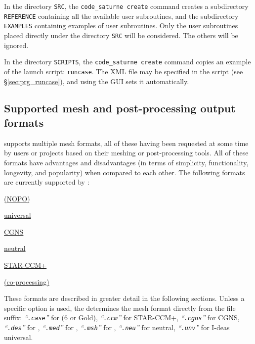 {{{{In the directory \texttt{SRC}, the \texttt{code\_saturne~create} command creates a
subdirectory \texttt{REFERENCE} containing all the available user subroutines,
and the subdirectory \texttt{EXAMPLES} containing examples of user subroutines.
Only the user subroutines placed directly under
the directory \texttt{SRC} will be considered. The others will be ignored.

In the directory \texttt{SCRIPTS}, the \texttt{code\_saturne~create} command copies an example of the launch script: \texttt{runcase}.
The XML file may be specified in the script (see \S\ref{sec:prg_runcase}),
and using the GUI sets it automatically.

\smallskip \noindent

\subsection{Supported mesh and post-processing output formats
\label{sec:formats}}

\CS supports multiple mesh formats, all of these having been requested
at some time by users or projects based on their meshing or post-processing
tools. All of these formats have advantages and disadvantages (in terms
of simplicity, functionality, longevity, and popularity) when compared to
each other. The following formats are currently supported by \CS:

\begin{list}{-}{}

\item \hyperref[sec:fmtdesc_des]{\simail (NOPO)}
\item \hyperref[sec:fmtdesc_unv]{\ideas universal}
\item \hyperref[sec:fmtdesc_med]{\med}
\item \hyperref[sec:fmtdesc_cgns]{CGNS}
\item \hyperref[sec:fmtdesc_ensight6]{}
\item \hyperref[sec:fmtdesc_ensightg]{\ensightg}
\item \hyperref[sec:fmtdesc_neu]{\gambit neutral}
\item \hyperref[sec:fmtdesc_gmsh]{\gmsh}
\item \hyperref[sec:fmtdesc:ccm]{STAR-CCM+}
\item \hyperref[sec:fmtdesc_catalyst]{\catalyst (co-processing)}
\end{list}

These formats are described in greater detail in the following sections.
Unless a specific option is used, the \pcs determines the mesh format directly
from the file suffix: %
{\em``\texttt{.case}''} for \ensight (6 or Gold),
{\em``\texttt{.ccm}''} for STAR-CCM+,
{\em``\texttt{.cgns}''} for CGNS,
{\em``\texttt{.des}''} for \simail,
{\em``\texttt{.med}''} for \med,
{\em``\texttt{.msh}''} for \gmsh,
{\em``\texttt{.neu}''} for \gambit neutral,
{\em``\texttt{.unv}''} for I-deas universal.

}}}}
